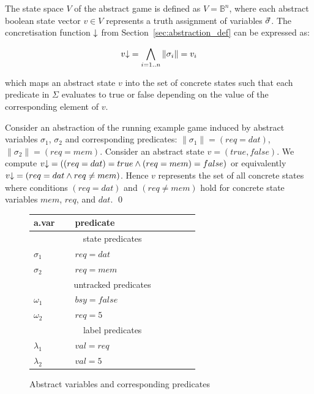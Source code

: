 The state space $V$ of the abstract game is defined as $V = \mathbb{B}^n$, where each abstract boolean state vector $v\in V$ represents a truth assignment of variables $\vec{\sigma}$. The concretisation function $\mathord{\downarrow}$ from Section~\ref{sec:abstraction_def} can be expressed as: 

\begin{equation}
v\mathord{\downarrow}=\bigwedge_{i=1..n}\|\sigma_i\|=v_i
\end{equation}

\noindent which maps an abstract state $v$ into the set of concrete states such that each predicate in $\Sigma$ evaluates to true or false depending on the value of the corresponding element of $v$.

\begin{ex}
    \everymath{\mathtt{\xdef\tmp{\fam\the\fam\relax}\aftergroup\tmp}}
    \everydisplay{\mathtt{\xdef\tmp{\fam\the\fam\relax}\aftergroup\tmp}}
    Consider an abstraction of the running example game induced by abstract variables $\sigma_1$, $\sigma_2$ and corresponding predicates: $\|\sigma_1\| = (req=dat)$, $\|\sigma_2\| = (req = mem)$.  Consider an abstract state $v=(true,false)$. We compute $v\mathord{\downarrow} = ((req=dat) = true \land (req = mem)=false)$ or equivalently $v\mathord{\downarrow} = (req=dat \land req \neq mem)$.  Hence $v$ represents the set of all concrete states where conditions $(req=dat)$ and  $(req \neq mem)$ hold for concrete state variables $mem$, $req$, and $dat$.
    \qed
\end{ex}

\begin{figure}
    \centering
    \caption{Abstract variables and corresponding predicates}
    \label{fig:ex_game_abstraction}
    \begin{tabular}{|p{0.14\linewidth}|p{0.5\linewidth}|}
        \hline
        {\bf a.var} & {\bf predicate} \\
        \hline\hline
        \multicolumn{2}{|c|}{state predicates} \\
        \hline
        $\sigma_1$ & $req=dat$   \\
        $\sigma_2$ & $req=mem$   \\
        \hline\hline
        \multicolumn{2}{|c|}{untracked predicates} \\
        \hline
        $\omega_1$ & $bsy=false$ \\
        $\omega_2$ & $req=5$     \\
        \hline\hline
        \multicolumn{2}{|c|}{label predicates} \\
        \hline
        $\lambda_1$ & $val=req$  \\
        $\lambda_2$ & $val=5$    \\
        \hline
    \end{tabular}
\end{figure}

